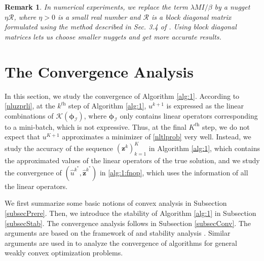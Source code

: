 \documentclass[10pt,reqno]{amsart}
\newcommand{\1}{{\chi}}
\numberwithin{equation}{section}
\theoremstyle{thmlemcorr}
\numberwithin{theorem}{section}
\theoremstyle{thmlemcorr*}
\theoremstyle{defi}
\theoremstyle{remexample}
\newtheorem{remark}[theorem]{Remark}
\theoremstyle{ass}
\begin{document}
\begin{remark}
\label{rmknugget}
In numerical experiments, we replace the term $\lambda M I / \beta$ by a nugget $\eta \mathcal{R}$, where $\eta >0$ is a small real number and $\mathcal{R}$ is a block diagonal matrix formulated using the method described in Sec. 3.4 of \cite{chen2021solving}. Using block diagonal matrices lets us choose smaller nuggets and get more accurate results. 
\end{remark}

\section{The Convergence Analysis}
\label{secConverge}
In this section, we study the convergence of Algorithm \ref{alg:1}.  According to  \eqref{nluzprli},  at the $k^{\textit{th}}$ step of Algorithm \ref{alg:1}, $u^{k+1}$ is expressed as the linear combinations of $\mathcal{K}(\boldsymbol{\phi}_{\mathcal{I}})$, where $\boldsymbol{\phi}_{\mathcal{I}}$   only contains linear operators corresponding to a mini-batch, which is not expressive. Thus, at the final $K^{\textit{th}}$ step, we do not expect that $u^{K+1}$ approximates a minimizer of \eqref{nltlprob} very well. Instead, we study the accuracy of the sequence $(\boldsymbol{z}^k)_{k=1}^K$ in  Algorithm \ref{alg:1}, which contains the approximated values of the linear operators of the true solution, and we study the convergence of $(\hat{u}^{k^*}, \hat{\boldsymbol{z}}^{k^*})$ in \eqref{alg:1:fnop}, which uses the information of all the linear operators. 

We first summarize some basic notions of convex analysis in Subsection \ref{subsecPrere}. Then, we introduce the stability of Algorithm \ref{alg:1} in Subsection \ref{subsecStab}. The convergence analysis follows in Subsection \ref{subsecConv}. The arguments  are based on the framework of \cite{davis2019stochastic} and stability analysis \cite{bousquet2002stability}. Similar arguments are used in \cite{deng2021minibatch} to analyze the convergence of algorithms for general weakly convex optimization problems. 
\end{document}
